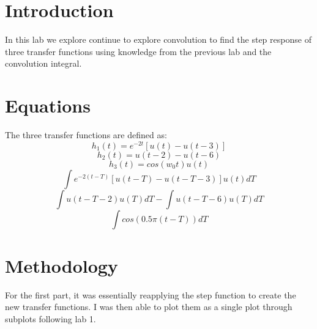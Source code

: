 \documentclass[12pt]{report}
\begin{document}
\section{Introduction}
 

In this lab we explore continue to explore convolution to find the step response of three transfer functions using knowledge from the previous lab and the convolution integral. 

\section{Equations}

The three transfer functions are defined as: 
\begin{equation*}
h_1(t) = e^{-2t}[u(t) - u(t-3)]
\end{equation*}
\begin{equation*}
h_2(t) = u(t-2) - u(t-6)
\end{equation*}
\begin{equation*}
h_3(t) = cos(w_0t)u(t)
\end{equation*}
\begin{equation*}
\int e^{-2(t-T)}[u(t-T) - u(t-T-3)]u(t)dT 
\end{equation*}
\begin{equation*}
\int u(t-T-2)u(T)dT - \int u(t-T-6)u(T)dT
\end{equation*}
\begin{equation*}
\int cos(0.5\pi (t-T))dT 
\end{equation*}


\section{Methodology}

For the first part, it was essentially reapplying the step function to create the new transfer functions. I was then able to plot them as a single plot through subplots following lab 1. 
\end{document}
